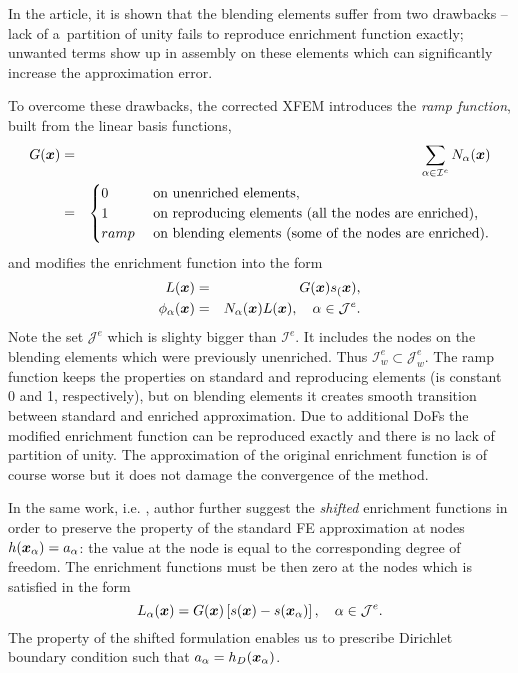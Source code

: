 In the article, it is shown that the blending elements suffer from two drawbacks -- lack of a~partition of unity fails to reproduce enrichment function exactly;
unwanted terms show up in assembly on these elements which can significantly increase the approximation error.
 
To overcome these drawbacks, the corrected XFEM introduces the \emph{ramp function}, built from the linear basis functions,
\begin{eqnarray} \label{eqn:ramp_function}
  G(\mathbf{\boldsymbol{x}}) &=& \sum_{\alpha\in\mathcal{I}^e} N_\alpha(\mathbf{\boldsymbol{x}})    \\
  &=& 
  \begin{cases}
    0 & \textrm{ on unenriched elements,}    \\
    1 & \textrm{ on reproducing elements (all the nodes are enriched),}    \\
    ramp & \textrm{ on blending elements (some of the nodes are enriched).}    \\
  \end{cases} \nonumber
\end{eqnarray}
and modifies the enrichment function into the form
\begin{eqnarray} \label{eqn:xfem_ramp}
    L(\mathbf{\boldsymbol{x}}) &=& G(\mathbf{\boldsymbol{x}}) s_(\mathbf{\boldsymbol{x}}),\\
    \phi_{\alpha}(\mathbf{\boldsymbol{x}}) &=& N_\alpha(\mathbf{\boldsymbol{x}})L(\mathbf{\boldsymbol{x}}), \quad \alpha\in\mathcal{J}^e.
\end{eqnarray}
Note the set $\mathcal{J}^e$ which is slighty bigger than $\mathcal{I}^e$. It includes the nodes on the blending
elements which were previously unenriched. Thus $\mathcal{I}^e_w\subset\mathcal{J}^e_w$.
The ramp function keeps the properties on standard and reproducing elements (is constant 0 and 1, respectively),
but on blending elements it creates smooth transition between standard and enriched approximation. Due to
additional DoFs the modified enrichment function can be reproduced exactly and there is no lack of partition of unity.
The approximation of the original enrichment function is of course worse but it does not damage the convergence of the method.


In the same work, i.e. \cite{fries_corrected_2008}, author further suggest the \emph{shifted} enrichment functions in order 
to preserve the property of the standard 
FE approximation at nodes $h(\mathbf{\boldsymbol{x}}_\alpha)=a_\alpha$: the value at the node is equal to the corresponding degree
of freedom. The enrichment functions must be then zero at the nodes which is satisfied in the form
\begin{equation} \label{eqn:xfem_shift}
    L_{\alpha}(\mathbf{\boldsymbol{x}}) = G(\mathbf{\boldsymbol{x}}) \left[s(\mathbf{\boldsymbol{x}}) - s(\mathbf{\boldsymbol{x}}_\alpha)\right],
    \quad \alpha\in\mathcal{J}^e.
\end{equation} 
The property of the shifted formulation enables us to prescribe Dirichlet boundary condition such that
$a_\alpha = h_D(\mathbf{\boldsymbol{x}}_\alpha)$.

